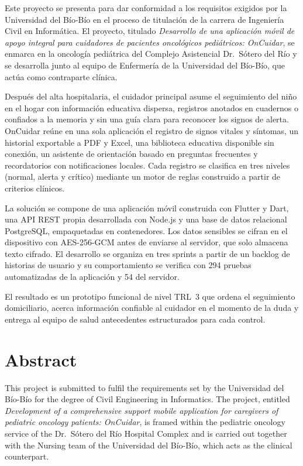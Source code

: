 \documentclass[11pt,letterpaper]{report}
\begin{document}
Este proyecto se presenta para dar conformidad a los requisitos exigidos por la
Universidad del Bío-Bío en el proceso de titulación de la carrera de Ingeniería
Civil en Informática. El proyecto, titulado \emph{Desarrollo de una aplicación
móvil de apoyo integral para cuidadores de pacientes oncológicos pediátricos:
OnCuidar}, se enmarca en la oncología pediátrica del Complejo Asistencial
Dr.~Sótero del Río y se desarrolla junto al equipo de Enfermería de la
Universidad del Bío-Bío, que actúa como contraparte clínica.

Después del alta hospitalaria, el cuidador principal asume el seguimiento del
niño en el hogar con información educativa dispersa, registros anotados en
cuadernos o confiados a la memoria y sin una guía clara para reconocer los signos
de alerta. OnCuidar reúne en una sola aplicación el registro de signos vitales y
síntomas, un historial exportable a PDF y Excel, una biblioteca educativa
disponible sin conexión, un asistente de orientación basado en preguntas
frecuentes y recordatorios con notificaciones locales. Cada registro se clasifica
en tres niveles (normal, alerta y crítico) mediante un motor de reglas construido
a partir de criterios clínicos.

La solución se compone de una aplicación móvil construida con Flutter y Dart, una
API REST propia desarrollada con Node.js y una base de datos relacional
PostgreSQL, empaquetadas en contenedores. Los datos sensibles se cifran en el
dispositivo con AES-256-GCM antes de enviarse al servidor, que solo almacena
texto cifrado. El desarrollo se organiza en tres sprints a partir de un backlog
de historias de usuario y su comportamiento se verifica con 294 pruebas
automatizadas de la aplicación y 54 del servidor.

El resultado es un prototipo funcional de nivel TRL~3 que ordena el seguimiento
domiciliario, acerca información confiable al cuidador en el momento de la duda y
entrega al equipo de salud antecedentes estructurados para cada control.

\chapter*{Abstract}

This project is submitted to fulfil the requirements set by the Universidad del
Bío-Bío for the degree of Civil Engineering in Informatics. The project, entitled
\emph{Development of a comprehensive support mobile application for caregivers of
pediatric oncology patients: OnCuidar}, is framed within the pediatric oncology
service of the Dr.~Sótero del Río Hospital Complex and is carried out together
with the Nursing team of the Universidad del Bío-Bío, which acts as the clinical
counterpart.
\end{document}

